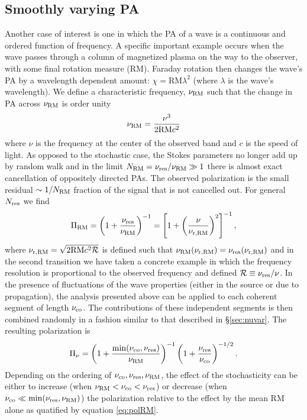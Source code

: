 \documentclass[fleqn,usenatbib]{mnras}
\begin{document}
	\subsection{Smoothly varying PA}
	\label{sec:meanRMPol}
	Another case of interest is one in which the PA of a wave is a continuous and ordered function of frequency.  A specific important example occurs when the wave passes through a column of magnetized plasma on the way to the observer, with some final rotation measure (RM). Faraday rotation then changes the wave's PA by a wavelength dependent amount: $\chi=\mbox{RM}\lambda^2$ (where $\lambda$ is the wave's wavelength). We define a characteristic frequency, $\nu_{\rm RM}$ such that the change in PA across $\nu_{\rm RM}$ is order unity
	\begin{equation}
		\label{eq:nuRM}
		\nu_{\rm RM}=\frac{\nu^3}{2\mbox{RM} c^2}
	\end{equation}
	where $\nu$ is the frequency at the center of the observed band and $c$ is the speed of light. As opposed to the stochastic case, the Stokes parameters no longer add up by random walk and in the limit $N_{\rm RM}=\nu_{\rm res}/\nu_{\rm RM}\gg1$ there is almost exact cancellation of oppositely directed PAs. The observed polarization is the small residual $\sim 1/N_{\rm RM}$ fraction of the signal that is not cancelled out. For general $N_{\rm res}$ we find
	\begin{equation}
		\label{eq:polRM}
		\Pi_{\rm RM}=\left(1+\frac{\nu_{\rm res}}{\nu_{\rm RM}}\right)^{-1}=\left[1+\left(\frac{\nu}{\nu_{\rm r,RM}}\right)^2\right]^{-1},
	\end{equation}
	where $\nu_{\rm r,RM}=\sqrt{2\mbox{RM} c^2\mathcal{R}}$ is defined such that $\nu_{\rm RM}(\nu_{\rm r,RM})=\nu_{\rm res}(\nu_{\rm r,RM})$ and in the second transition we have taken a concrete example in which the frequency resolution is proportional to the observed frequency and defined $\mathcal{R}\equiv \nu_{\rm res}/\nu$. 
	In the presence of fluctuations of the wave properties (either in the source or due to propagation), the analysis presented above can be applied to each coherent segment of length $\nu_{\rm co}$. The contributions of these independent segments is then combined randomly in a fashion similar to that described in \S \ref{sec:nuvar}.
	The resulting polarization is
	\begin{equation}
		\label{eq:combineRMstoch}
		\Pi_{\nu}=\left(1+\frac{\min(\nu_{\rm co},\nu_{\rm res})}{\nu_{\rm RM}}\right)^{-1} \left(1+\frac{\nu_{\rm res}}{\nu_{\rm co}}\right)^{-1/2}.
	\end{equation}
	Depending on the ordering of $\nu_{\rm co},\nu_{\rm res},\nu_{\rm RM}$, the effect of the stochasticity can be either to increase (when $\nu_{\rm RM}<\nu_{\rm co}<\nu_{\rm res}$) or decrease (when $\nu_{\rm co}\ll \min(\nu_{\rm res},\nu_{\rm RM})$) the polarization relative to the effect by the mean RM alone as quatified by equation \ref{eq:polRM}. 
	
\end{document}
